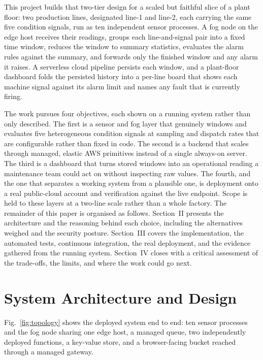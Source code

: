 \documentclass[conference]{IEEEtran}
\begin{document}
This project builds that two-tier design for a scaled but faithful slice of a plant floor: two production lines, designated line-1 and line-2, each carrying the same five condition signals, run as ten independent sensor processes. A fog node on the edge host receives their readings, groups each line-and-signal pair into a fixed time window, reduces the window to summary statistics, evaluates the alarm rules against the summary, and forwards only the finished window and any alarm it raises. A serverless cloud pipeline persists each window, and a plant-floor dashboard folds the persisted history into a per-line board that shows each machine signal against its alarm limit and names any fault that is currently firing.

The work pursues four objectives, each shown on a running system rather than only described. The first is a sensor and fog layer that genuinely windows and evaluates five heterogeneous condition signals at sampling and dispatch rates that are configurable rather than fixed in code. The second is a backend that scales through managed, elastic AWS primitives instead of a single always-on server. The third is a dashboard that turns stored windows into an operational reading a maintenance team could act on without inspecting raw values. The fourth, and the one that separates a working system from a plausible one, is deployment onto a real public-cloud account and verification against the live endpoint. Scope is held to these layers at a two-line scale rather than a whole factory. The remainder of this paper is organised as follows. Section~II presents the architecture and the reasoning behind each choice, including the alternatives weighed and the security posture. Section~III covers the implementation, the automated tests, continuous integration, the real deployment, and the evidence gathered from the running system. Section~IV closes with a critical assessment of the trade-offs, the limits, and where the work could go next.

\section{System Architecture and Design}

Fig.~\ref{fig:topology} shows the deployed system end to end: ten sensor processes and the fog node sharing one edge host, a managed queue, two independently deployed functions, a key-value store, and a browser-facing bucket reached through a managed gateway.
\end{document}
